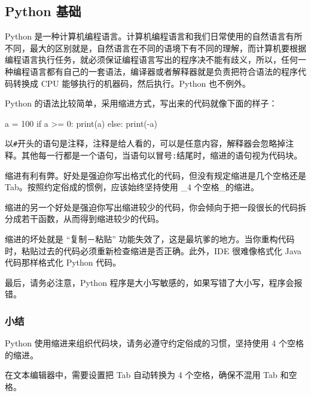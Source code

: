 \hypertarget{python-ux57faux7840}{%
\subsection{Python 基础}\label{python-ux57faux7840}}

Python
是一种计算机编程语言。计算机编程语言和我们日常使用的自然语言有所不同，最大的区别就是，自然语言在不同的语境下有不同的理解，而计算机要根据编程语言执行任务，就必须保证编程语言写出的程序决不能有歧义，所以，任何一种编程语言都有自己的一套语法，编译器或者解释器就是负责把符合语法的程序代码转换成
CPU 能够执行的机器码，然后执行。Python 也不例外。

Python 的语法比较简单，采用缩进方式，写出来的代码就像下面的样子：

\begin{pythoncode}
a = 100
if a >= 0:
    print(a)
else:
    print(-a)
\end{pythoncode}

以\texttt{\#}开头的语句是注释，注释是给人看的，可以是任意内容，解释器会忽略掉注释。其他每一行都是一个语句，当语句以冒号\texttt{:}结尾时，缩进的语句视为代码块。

缩进有利有弊。好处是强迫你写出格式化的代码，但没有规定缩进是几个空格还是
Tab。按照约定俗成的惯例，应该始终坚持使用 \_4 个空格\_的缩进。

缩进的另一个好处是强迫你写出缩进较少的代码，你会倾向于把一段很长的代码拆分成若干函数，从而得到缩进较少的代码。

缩进的坏处就是 ``复制－粘贴''
功能失效了，这是最坑爹的地方。当你重构代码时，粘贴过去的代码必须重新检查缩进是否正确。此外，IDE
很难像格式化 Java 代码那样格式化 Python 代码。

最后，请务必注意，Python
程序是大小写敏感的，如果写错了大小写，程序会报错。

\hypertarget{ux5c0fux7ed3}{%
\subsubsection{小结}\label{ux5c0fux7ed3}}

Python 使用缩进来组织代码块，请务必遵守约定俗成的习惯，坚持使用 4
个空格的缩进。

在文本编辑器中，需要设置把 Tab 自动转换为 4 个空格，确保不混用 Tab
和空格。

